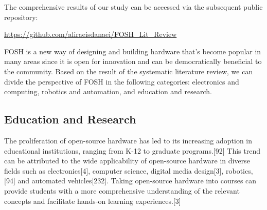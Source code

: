 \documentclass[final-report.tex]{subfiles}
\begin{document}
The comprehensive results of our study can be accessed via the subsequent public repository:
\par
\url{https://github.com/aliraeisdanaei/FOSH_Lit_Review}

FOSH is a new way of designing and building hardware that's become popular in many areas since it is open for innovation and can be democratically beneficial to the community. 
Based on the result of the systematic literature review, we can divide the perspective of FOSH in the following categories: electronics and computing, robotics and automation, and education and research.

\subsection{Education and Research}





The proliferation of open-source hardware has led to its increasing adoption in educational institutions, ranging from K-12 to graduate programs.[92] 
This trend can be attributed to the wide applicability of open-source hardware in diverse fields such as electronics[4], computer science, digital media design[3], robotics,[94] and automated vehicles[232]. 
Taking open-source hardware into courses can provide students with a more comprehensive understanding of the relevant concepts and facilitate hands-on learning experiences.[3]
\end{document}
